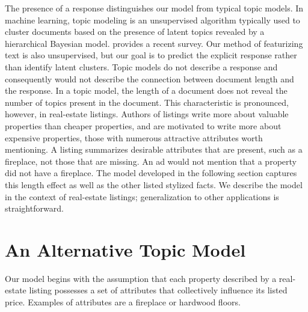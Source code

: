 \documentclass[12pt]{article}
\begin{document}
The presence of a response distinguishes our model from typical topic models.  In machine learning, topic modeling is an unsupervised algorithm typically used to cluster documents based on the presence of latent topics revealed by a hierarchical Bayesian  model.  \citet{blei12} provides a recent survey.  Our method of featurizing text is also unsupervised,  but our goal is to predict the explicit response rather than identify latent clusters. Topic models do not describe a response and consequently would not describe the connection between document length and the response.  In a topic model, the length of a document does not reveal the number of topics  present in the document.  This characteristic is pronounced, however,  in real-estate listings.  Authors of listings write more about valuable properties than cheaper properties, and are motivated to write more about expensive properties, those with numerous attractive attributes worth mentioning.  A listing summarizes desirable attributes that are present, such as a fireplace, not those that are missing.   An ad would not mention that a property did not have a fireplace.  The  model developed in the following section captures this length effect as well as the other listed stylized facts.  We describe the model in the context of real-estate listings; generalization to other applications is straightforward.


\section{ An Alternative Topic Model } 

Our model begins with the assumption that each property described by a real-estate listing possesses a set of attributes that collectively influence its listed price.   Examples of attributes are a fireplace or hardwood floors. 
 
\end{document}
